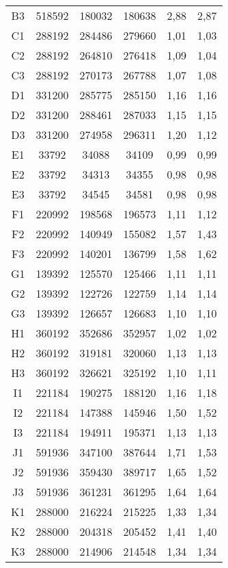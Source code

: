\begin{center}
\begin{longtable}{cccccc}
    B3    & 518592 & 180032 & 180638 & 2,88  & 2,87 \\
    C1    & 288192 & 284486 & 279660 & 1,01  & 1,03 \\
    C2    & 288192 & 264810 & 276418 & 1,09  & 1,04 \\
    C3    & 288192 & 270173 & 267788 & 1,07  & 1,08 \\
    D1    & 331200 & 285775 & 285150 & 1,16  & 1,16 \\
    D2    & 331200 & 288461 & 287033 & 1,15  & 1,15 \\
    D3    & 331200 & 274958 & 296311 & 1,20  & 1,12 \\
    E1    & 33792 & 34088 & 34109 & 0,99  & 0,99 \\
    E2    & 33792 & 34313 & 34355 & 0,98  & 0,98 \\
    E3    & 33792 & 34545 & 34581 & 0,98  & 0,98 \\
    F1    & 220992 & 198568 & 196573 & 1,11  & 1,12 \\
    F2    & 220992 & 140949 & 155082 & 1,57  & 1,43 \\
    F3    & 220992 & 140201 & 136799 & 1,58  & 1,62 \\
    G1    & 139392 & 125570 & 125466 & 1,11  & 1,11 \\
    G2    & 139392 & 122726 & 122759 & 1,14  & 1,14 \\
    G3    & 139392 & 126657 & 126683 & 1,10  & 1,10 \\
    H1    & 360192 & 352686 & 352957 & 1,02  & 1,02 \\
    H2    & 360192 & 319181 & 320060 & 1,13  & 1,13 \\
    H3    & 360192 & 326621 & 325192 & 1,10  & 1,11 \\
    I1    & 221184 & 190275 & 188120 & 1,16  & 1,18 \\
    I2    & 221184 & 147388 & 145946 & 1,50  & 1,52 \\
    I3    & 221184 & 194911 & 195371 & 1,13  & 1,13 \\
    J1    & 591936 & 347100 & 387644 & 1,71  & 1,53 \\
    J2    & 591936 & 359430 & 389717 & 1,65  & 1,52 \\
    J3    & 591936 & 361231 & 361295 & 1,64  & 1,64 \\
    K1    & 288000 & 216224 & 215225 & 1,33  & 1,34 \\
    K2    & 288000 & 204318 & 205452 & 1,41  & 1,40 \\
    K3    & 288000 & 214906 & 214548 & 1,34  & 1,34 \\

\end{longtable}
\end{center}
